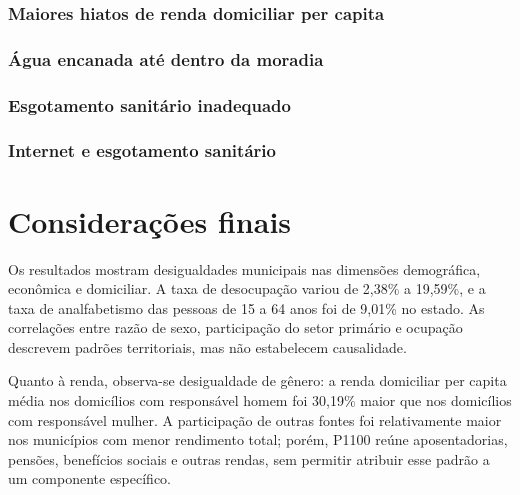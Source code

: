 \documentclass[a4paper,12pt]{article}
\begin{document}



\subsubsection{Maiores hiatos de renda domiciliar per capita}




\subsubsection{Água encanada até dentro da moradia}




\subsubsection{Esgotamento sanitário inadequado}




\subsubsection{Internet e esgotamento sanitário}





\section{Considerações finais}

Os resultados mostram desigualdades municipais nas dimensões demográfica, econômica e domiciliar. A taxa de desocupação variou de 2,38\% a 19,59\%, e a taxa de analfabetismo das pessoas de 15 a 64 anos foi de 9,01\% no estado. As correlações entre razão de sexo, participação do setor primário e ocupação descrevem padrões territoriais, mas não estabelecem causalidade.

Quanto à renda, observa-se desigualdade de gênero: a renda domiciliar per capita média nos domicílios com responsável homem foi 30,19\% maior que nos domicílios com responsável mulher. A participação de outras fontes foi relativamente maior nos municípios com menor rendimento total; porém, P1100 reúne aposentadorias, pensões, benefícios sociais e outras rendas, sem permitir atribuir esse padrão a um componente específico.
\end{document}
